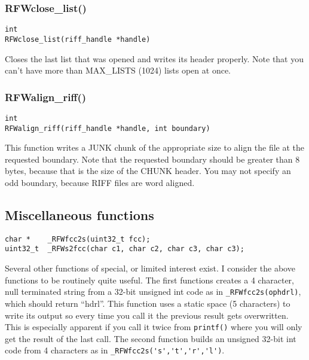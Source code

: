 \documentclass[12pt, a4paper]{article}
\begin{document}
\subsubsection{RFWclose\_list()}
\begin{verbatim}
int
RFWclose_list(riff_handle *handle)
\end{verbatim}
Closes the last list that was opened and writes its header properly. Note that
you can't have more than MAX\_LISTS (1024) lists open at once.

\subsubsection{RFWalign\_riff()}
\begin{verbatim}
int
RFWalign_riff(riff_handle *handle, int boundary)
\end{verbatim}
This function writes a JUNK chunk of the appropriate size
to align the file at the requested boundary. Note that the
requested boundary should be greater than 8 bytes, because
that is the size of the CHUNK header. You may not specify
an odd boundary, because RIFF files are word aligned.

\subsection{Miscellaneous functions}
\begin{verbatim}
char *    _RFWfcc2s(uint32_t fcc);
uint32_t  _RFWs2fcc(char c1, char c2, char c3, char c3);
\end{verbatim}
Several other functions of special, or limited interest exist.
I consider the above functions to be 
routinely quite useful. 
The first functions creates a 4 character, null
terminated string from a 32-bit unsigned int code  as in 
\verb+_RFWfcc2s(ophdrl)+, which should return ``hdrl''.
This function uses a static space (5 characters) to write
its output so every time you call it the previous result
gets overwritten. This is especially apparent if you
call it twice from \verb+printf()+ where you will only get
the result of the last call.
The second function builds an unsigned
32-bit int code from 4 characters as in \verb+_RFWfcc2s('s','t','r','l')+.


\end{document}
